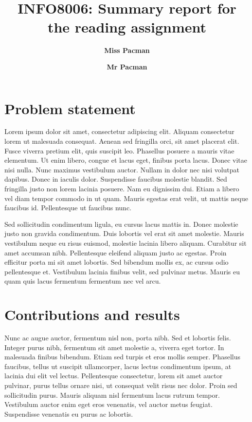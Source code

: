\documentclass[twocolumn,superscriptaddress,aps]{revtex4-1}
\begin{document}

\title{\Large{INFO8006: Summary report for the reading assignment}}
\vspace{1cm}
\author{\small{\bf Miss Pacman}}
\author{\small{\bf Mr Pacman}}

\maketitle


\section{Problem statement}

Lorem ipsum dolor sit amet, consectetur adipiscing elit. Aliquam consectetur lorem ut malesuada consequat. Aenean sed fringilla orci, sit amet placerat elit. Fusce viverra pretium elit, quis suscipit leo. Phasellus posuere a mauris vitae elementum. Ut enim libero, congue et lacus eget, finibus porta lacus. Donec vitae nisi nulla. Nunc maximus vestibulum auctor. Nullam in dolor nec nisi volutpat dapibus. Donec in iaculis dolor. Suspendisse faucibus molestie blandit. Sed fringilla justo non lorem lacinia posuere. Nam eu dignissim dui. Etiam a libero vel diam tempor commodo in ut quam. Mauris egestas erat velit, ut mattis neque faucibus id. Pellentesque ut faucibus nunc.

Sed sollicitudin condimentum ligula, eu cursus lacus mattis in. Donec molestie justo non gravida condimentum. Duis lobortis vel erat sit amet molestie. Mauris vestibulum neque eu risus euismod, molestie lacinia libero aliquam. Curabitur sit amet accumsan nibh. Pellentesque eleifend aliquam justo ac egestas. Proin efficitur porta mi sit amet lobortis. Sed bibendum mollis ex, ac cursus odio pellentesque et. Vestibulum lacinia finibus velit, sed pulvinar metus. Mauris eu quam quis lacus fermentum fermentum nec vel arcu.

\section{Contributions and results}

Nunc ac augue auctor, fermentum nisl non, porta nibh. Sed et lobortis felis. Integer purus nibh, fermentum sit amet molestie a, viverra eget tortor. In malesuada finibus bibendum. Etiam sed turpis et eros mollis semper. Phasellus faucibus, tellus ut suscipit ullamcorper, lacus lectus condimentum ipsum, at lacinia dui elit vel lectus. Pellentesque consectetur, lorem sit amet auctor pulvinar, purus tellus ornare nisi, ut consequat velit risus nec dolor. Proin sed sollicitudin purus. Mauris aliquam nisl fermentum lacus rutrum tempor. Vestibulum auctor enim eget eros venenatis, vel auctor metus feugiat. Suspendisse venenatis eu purus ac lobortis.
\end{document}
